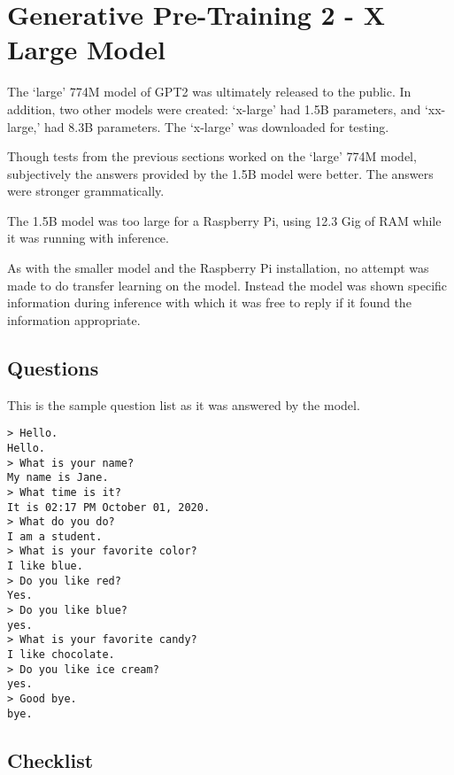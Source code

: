 
\section{Generative Pre-Training 2 - X Large Model}

The `large' 774M model of GPT2 was ultimately released to the public. In addition, two other models were created: `x-large' had 1.5B parameters, and `xx-large,' had 8.3B parameters. The `x-large' was downloaded for testing.

Though tests from the previous sections worked on the `large' 774M model, subjectively the answers provided by the 1.5B model were better. The answers were stronger grammatically.

The 1.5B model was too large for a Raspberry Pi, using 12.3 Gig of RAM while it was running with inference. %

As with the smaller model and the Raspberry Pi installation, no attempt was made to do transfer learning on the model. Instead the model was shown specific information during inference with which it was free to reply if it found the information appropriate.


\label{chapter-gpt2-xl-intro}

\subsection{Questions}

This is the sample question list as it was answered by the model.

\begin{verbatim}
> Hello.
Hello. 
> What is your name? 
My name is Jane.  
> What time is it?
It is 02:17 PM October 01, 2020. 
> What do you do? 
I am a student. 
> What is your favorite color? 
I like blue. 
> Do you like red?
Yes. 
> Do you like blue? 
yes. 
> What is your favorite candy? 
I like chocolate. 
> Do you like ice cream?
yes. 
> Good bye.
bye. 
\end{verbatim}

\subsection{Checklist}

